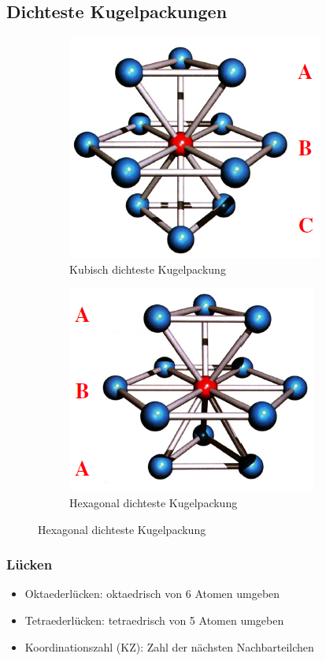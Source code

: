 \subsection{Dichteste Kugelpackungen}
\begin{figure}[htbp]
	\begin{subfigure}{0.49\linewidth}
		\centering
		\includegraphics[width=0.49\linewidth]{images/1_kubisch_dichteste_KuPa.png}
		\caption{Kubisch dichteste Kugelpackung}
	\end{subfigure}
	\begin{subfigure}{0.49\linewidth}
		\centering
		\includegraphics[width=0.49\linewidth]{images/1_hexagonal_dichteste_KuPa.png}
		\caption{Hexagonal dichteste Kugelpackung}
	\end{subfigure}
\end{figure}

\subsubsection{Lücken}
\begin{itemize}
	\item Oktaederlücken: oktaedrisch von 6 Atomen umgeben
	\item Tetraederlücken: tetraedrisch von 5 Atomen umgeben
	\item Koordinationszahl (KZ): Zahl der nächsten Nachbarteilchen
\end{itemize}

